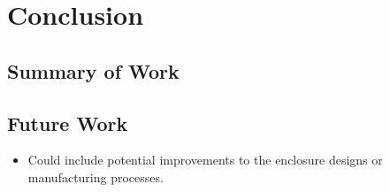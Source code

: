 \section{Conclusion}
\label{sec:conclusion}
\subsection{Summary of Work}
\subsection{Future Work}
\begin{itemize}
	\item Could include potential improvements to the enclosure designs or manufacturing processes.
\end{itemize}
